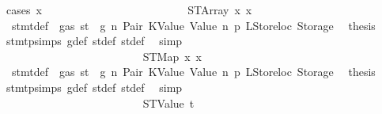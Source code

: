 \begin{isabellebody}
\ {\isacharparenleft}{\kern0pt}cases\ x{}{\isacharparenright}{\kern0pt}\isanewline
\ \ \ \ \ \ \ \ \ \ \ \ \ \ \ \ \ \ \ \ \ \ \ \ \isamarkupfalse%
\ {\isacharparenleft}{\kern0pt}STArray\ x{}{}\ x{}{}{\isacharparenright}{\kern0pt}\isanewline
\ \ \ \ \ \ \ \ \ \ \ \ \ \ \ \ \ \ \ \ \ \ \ \ \isamarkupfalse%
\ {}{\isacharparenleft}{\kern0pt}{}{\isacharparenright}{\kern0pt}\ stmt{\isacharunderscore}{\kern0pt}def\ {\isacharbackquoteopen}{\isasymnot}\ gas\ st\ {\isasymle}\ g{\isacharbackquoteclose}\ n\ Pair\ KValue\ Value\ n{}\ p{}\ LStoreloc\ Storage\ \isamarkupfalse%
\ {\isacharquery}{\kern0pt}thesis\ \isamarkupfalse%
\ stmt{\isachardot}{\kern0pt}psimps{\isacharparenleft}{\kern0pt}{}{\isacharparenright}{\kern0pt}\ g{\isacharunderscore}{\kern0pt}def\ st{\isacharprime}{\kern0pt}{\isacharunderscore}{\kern0pt}def\ st{\isacharprime}{\kern0pt}{\isacharprime}{\kern0pt}{\isacharunderscore}{\kern0pt}def\ \isamarkupfalse%
\ simp\isanewline
\ \ \ \ \ \ \ \ \ \ \ \ \ \ \ \ \ \ \ \ \ \ \isamarkupfalse%
\isanewline
\ \ \ \ \ \ \ \ \ \ \ \ \ \ \ \ \ \ \ \ \ \ \ \ \isamarkupfalse%
\ {\isacharparenleft}{\kern0pt}STMap\ x{}{}\ x{}{}{\isacharparenright}{\kern0pt}\isanewline
\ \ \ \ \ \ \ \ \ \ \ \ \ \ \ \ \ \ \ \ \ \ \ \ \isamarkupfalse%
\ {}{\isacharparenleft}{\kern0pt}{}{\isacharparenright}{\kern0pt}\ stmt{\isacharunderscore}{\kern0pt}def\ {\isacharbackquoteopen}{\isasymnot}\ gas\ st\ {\isasymle}\ g{\isacharbackquoteclose}\ n\ Pair\ KValue\ Value\ n{}\ p{}\ LStoreloc\ Storage\ \isamarkupfalse%
\ {\isacharquery}{\kern0pt}thesis\ \isamarkupfalse%
\ stmt{\isachardot}{\kern0pt}psimps{\isacharparenleft}{\kern0pt}{}{\isacharparenright}{\kern0pt}\ g{\isacharunderscore}{\kern0pt}def\ st{\isacharprime}{\kern0pt}{\isacharunderscore}{\kern0pt}def\ st{\isacharprime}{\kern0pt}{\isacharprime}{\kern0pt}{\isacharunderscore}{\kern0pt}def\ \isamarkupfalse%
\ simp\isanewline
\ \ \ \ \ \ \ \ \ \ \ \ \ \ \ \ \ \ \ \ \ \ \isamarkupfalse%
\isanewline
\ \ \ \ \ \ \ \ \ \ \ \ \ \ \ \ \ \ \ \ \ \ \ \ \isamarkupfalse%
\ {\isacharparenleft}{\kern0pt}STValue\ t{\isacharprime}{\kern0pt}{\isacharparenright}{\kern0pt}\isanewline
\ \ \ \ \ \ \ \ \ \ \ \ \ \ \ \ \ \ \ \ \ \ \ \ \isamarkupfalse%

\end{isabellebody}
